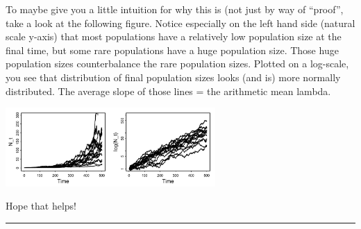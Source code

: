 \documentclass{article}
\begin{document}
To maybe give you a little intuition for why this is (not just by way of ``proof'', take a look at the following figure. Notice especially on the left hand side (natural scale y-axis) that most populations have a relatively low population size at the final time, but some rare populations have a huge population size. Those huge population sizes counterbalance the rare population sizes. Plotted on a log-scale, you see that distribution of final population sizes looks (and is) more normally distributed.
The average slope of those lines = the arithmetic mean lambda.

\begin{center}
 \includegraphics[width=8cm]{figs/image1}
\end{center}

Hope that helps!

\rule[0.5ex]{\linewidth}{1pt}
\end{document}
